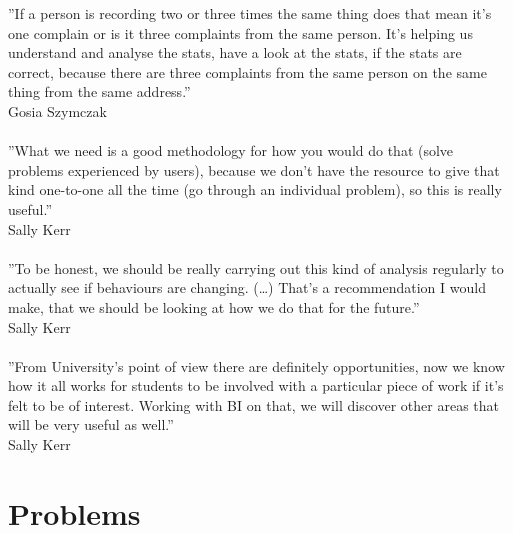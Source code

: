 ''If a person is recording two or three times the same thing does that mean it's one complain or is it three complaints from the same person. It's helping us understand and analyse the stats, have a look at the stats, if the stats are correct, because there are three complaints from the same person on the same thing from the same address.''\\
Gosia Szymczak\\\\
''What we need is a good methodology for how you would do that (solve problems experienced by users), because we don't have the resource to give that kind one-to-one all the time (go through an individual problem), so this is really useful.''\\
Sally Kerr\\\\
''To be honest, we should be really carrying out this kind of analysis regularly to actually see if behaviours are changing. (…) That's a recommendation I would make, that we should be looking at how we do that for the future.''\\
Sally Kerr\\\\
''From University's point of view there are definitely opportunities, now we know how it all works for students to be involved with a particular piece of work if it's felt to be of interest. Working with BI on that, we will discover other areas that will be very useful as well.''\\
Sally Kerr\\

	\section{Problems}
	
